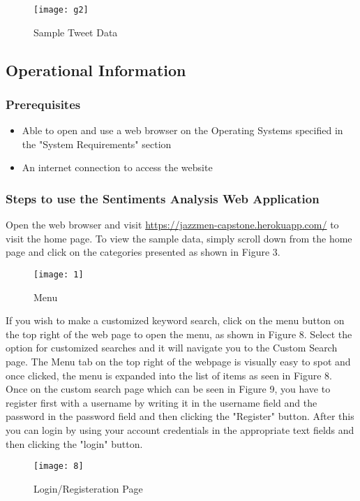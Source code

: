 \documentclass[12pt, titlepage]{article}
\begin{document}
\begin{figure}[H]
\centering
\texttt{[image: g2]}
\caption{Sample Tweet Data}
\label{fig:Result}
\end{figure}

\subsection{Operational Information}
\subsubsection{Prerequisites}
\begin{itemize}
\item Able to open and use a web browser on the Operating Systems specified in the "System Requirements" section
\item An internet connection to access the website
\end{itemize}

\subsubsection{Steps to use the Sentiments Analysis Web Application}
Open the web browser and visit \url{https://jazzmen-capstone.herokuapp.com/} to visit the home page. To view the sample data, simply scroll down from the home page and click on the categories presented as shown in Figure 3.

\begin{figure}[H]
\centering
\texttt{[image: 1]}
\caption{Menu}
\label{fig:Menu}
\end{figure}

If you wish to make a customized keyword search, click on the menu button on the top right of the web page to open the menu, as shown in Figure 8. Select the option for customized searches and it will navigate you to the Custom Search page. The Menu tab on the top right of the webpage is visually easy to spot and once clicked, the menu is expanded into the list of items as seen in Figure 8. \\
Once on the custom search page which can be seen in Figure 9, you have to register first with a username by writing it in the username field and the password in the password field and then clicking the "Register" button. After this you can login by using your account credentials in the appropriate text fields and then clicking the "login" button. 

\begin{figure}[H]
\centering
\texttt{[image: 8]}
\caption{Login/Registeration Page}
\label{fig:Menu}
\end{figure}
\end{document}
